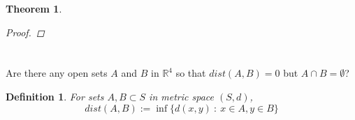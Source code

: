 \documentclass[]{article}
\newcommand{\R}{\mathbb{R}}
\newcommand{\st}{\ : \ }
\newtheorem{definition}{Definition}
\newtheorem{theorem}{Theorem}
\begin{document}
\begin{theorem}
\begin{proof}
    \end{proof}
\end{theorem}















\newpage
\section{}
Are there any open sets $A$ and $B$ in $\R^4$ so that $dist(A,B) = 0$ but $A \cap B = \emptyset$?

\begin{definition}
    For sets $A,B \subset S$ in metric space $(S,d)$, 
    \[dist(A,B) := \inf\{d(x,y) \st x \in A, y \in B\}\]
\end{definition}
\end{document}
